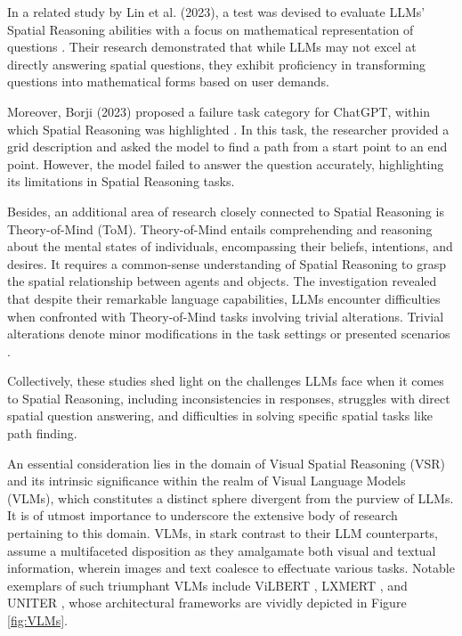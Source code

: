 \documentclass[twocolumn,11pt]{report}
\begin{document}
In a related study by Lin et al. (2023), a test was devised to evaluate LLMs' Spatial Reasoning abilities with a focus on mathematical representation of questions \cite{lin2023using}. Their research demonstrated that while LLMs may not excel at directly answering spatial questions, they exhibit proficiency in transforming questions into mathematical forms based on user demands.

Moreover, Borji (2023) proposed a failure task category for ChatGPT, within which Spatial Reasoning was highlighted \cite{borji2023categorical}. In this task, the researcher provided a grid description and asked the model to find a path from a start point to an end point. However, the model failed to answer the question accurately, highlighting its limitations in Spatial Reasoning tasks.

Besides, an additional area of research closely connected to Spatial Reasoning is Theory-of-Mind (ToM). Theory-of-Mind entails comprehending and reasoning about the mental states of individuals, encompassing their beliefs, intentions, and desires. It requires a common-sense understanding of Spatial Reasoning to grasp the spatial relationship between agents and objects. The investigation revealed that despite their remarkable language capabilities, LLMs encounter difficulties when confronted with Theory-of-Mind tasks involving trivial alterations. Trivial alterations denote minor modifications in the task settings or presented scenarios \cite{ullman2023large}.

Collectively, these studies shed light on the challenges LLMs face when it comes to Spatial Reasoning, including inconsistencies in responses, struggles with direct spatial question answering, and difficulties in solving specific spatial tasks like path finding. 

An essential consideration lies in the domain of Visual Spatial Reasoning (VSR) and its intrinsic significance within the realm of Visual Language Models (VLMs), which constitutes a distinct sphere divergent from the purview of LLMs. It is of utmost importance to underscore the extensive body of research pertaining to this domain. VLMs, in stark contrast to their LLM counterparts, assume a multifaceted disposition as they amalgamate both visual and textual information, wherein images and text coalesce to effectuate various tasks. Notable exemplars of such triumphant VLMs include ViLBERT \cite{li2019visualbert}, LXMERT \cite{tan2019lxmert}, and UNITER \cite{chen2020uniter}, whose architectural frameworks are vividly depicted in Figure \ref{fig:VLMs}.
\end{document}
